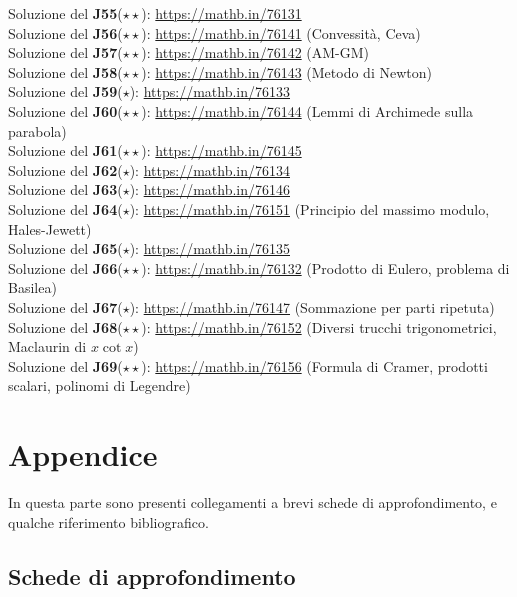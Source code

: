 \documentclass[a4paper,twoside]{article}
\theoremstyle{definition}
\numberwithin{theorem}{section}
\begin{document}
Soluzione del \textbf{J55}($\star\star$): \url{https://mathb.in/76131} \\
Soluzione del \textbf{J56}($\star\star$): \url{https://mathb.in/76141}  (Convessità, Ceva)\\
Soluzione del \textbf{J57}($\star\star$): \url{https://mathb.in/76142}  (AM-GM)\\
Soluzione del \textbf{J58}($\star\star$): \url{https://mathb.in/76143}  (Metodo di Newton)\\
Soluzione del \textbf{J59}($\star$): \url{https://mathb.in/76133} \\
Soluzione del \textbf{J60}($\star\star$): \url{https://mathb.in/76144} (Lemmi di Archimede sulla parabola)\\
Soluzione del \textbf{J61}($\star\star$): \url{https://mathb.in/76145} \\
Soluzione del \textbf{J62}($\star$): \url{https://mathb.in/76134} \\
Soluzione del \textbf{J63}($\star$): \url{https://mathb.in/76146} \\
Soluzione del \textbf{J64}($\star$): \url{https://mathb.in/76151} (Principio del massimo modulo, Hales-Jewett)\\
Soluzione del \textbf{J65}($\star$): \url{https://mathb.in/76135} \\
Soluzione del \textbf{J66}($\star\star$): \url{https://mathb.in/76132} (Prodotto di Eulero, problema di Basilea)\\
Soluzione del \textbf{J67}($\star$): \url{https://mathb.in/76147} (Sommazione per parti ripetuta)\\
Soluzione del \textbf{J68}($\star\star$): \url{https://mathb.in/76152} (Diversi trucchi trigonometrici, Maclaurin di $x\cot x$)\\
Soluzione del \textbf{J69}($\star\star$): \url{https://mathb.in/76156} (Formula di Cramer, prodotti scalari, polinomi di Legendre)\\

\newpage
\section{Appendice}
In questa parte sono presenti collegamenti a brevi schede di approfondimento, e qualche riferimento bibliografico.

\subsection{Schede di approfondimento}
\end{document}
